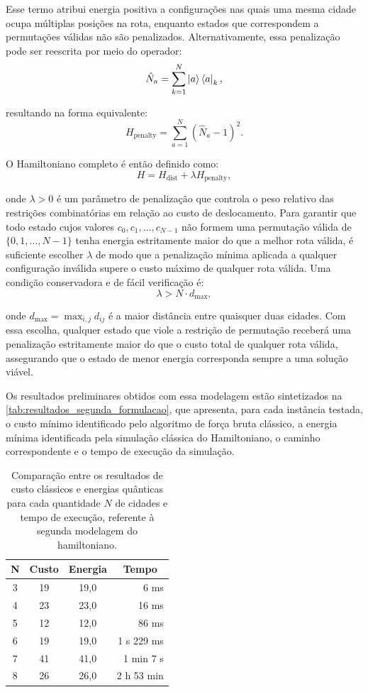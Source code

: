     Esse termo atribui energia positiva a configurações nas quais uma mesma cidade ocupa múltiplas posições na rota, enquanto estados que correspondem a permutações válidas não são penalizados. Alternativamente, essa penalização pode ser reescrita por meio do operador:
    $$
    \hat{N}_a = \sum_{k=1}^N \ket{a}\bra{a}_k,
    $$

    \noindent resultando na forma equivalente:
    $$
    H_{\text{penalty}} = \sum_{a=1}^N \left(\hat{N}_a - 1 \right)^2.
    $$

    O Hamiltoniano completo é então definido como:
    $$
    H = H_{\text{dist}} + \lambda H_{\text{penalty}},
    $$

    \noindent onde $\lambda > 0$ é um parâmetro de penalização que controla o peso relativo das restrições combinatórias em relação ao custo de deslocamento. Para garantir que todo estado cujos valores $c_0, c_1, \dots, c_{N-1}$ não formem uma permutação válida de $\{0, 1, \dots, N-1\}$ tenha energia estritamente maior do que a melhor rota válida, é suficiente escolher $\lambda$ de modo que a penalização mínima aplicada a qualquer configuração inválida supere o custo máximo de qualquer rota válida. Uma condição conservadora e de fácil verificação é:
    $$
    \lambda > N \cdot d_{\max},
    $$

    \noindent onde $d_{\max} = \max_{i,j} d_{ij}$ é a maior distância entre quaisquer duas cidades. Com essa escolha, qualquer estado que viole a restrição de permutação receberá uma penalização estritamente maior do que o custo total de qualquer rota válida, assegurando que o estado de menor energia corresponda sempre a uma solução viável.

    Os resultados preliminares obtidos com essa modelagem estão sintetizados na \autoref{tab:resultados_segunda_formulacao}, que apresenta, para cada instância testada, o custo mínimo identificado pelo algoritmo de força bruta clássico, a energia mínima identificada pela simulação clássica do Hamiltoniano, o caminho correspondente e o tempo de execução da simulação.

    \begin{table}[!htb]
    \centering
    \caption{Comparação entre os resultados de custo clássicos e energias quânticas para cada quantidade $N$ de cidades e tempo de execução, referente à segunda modelagem do hamiltoniano.}
    \label{tab:resultados_segunda_formulacao}
    \begin{tabular}{|c|c|c|r|}
    \hline
    \textbf{N} & \textbf{Custo} & \textbf{Energia} & \multicolumn{1}{c|}{\textbf{Tempo}} \\ \hline
    3 & 19 & 19,0 & 6 ms \\ \hline
    4 & 23 & 23,0 & 16 ms \\ \hline
    5 & 12 & 12,0 & 86 ms \\ \hline
    6 & 19 & 19,0 & 1 s 229 ms \\ \hline
    7 & 41 & 41,0 & 1 min 7 s \\ \hline
    8 & 26 & 26,0 & 2 h 53 min \\ \hline
    \end{tabular}
    \end{table}

